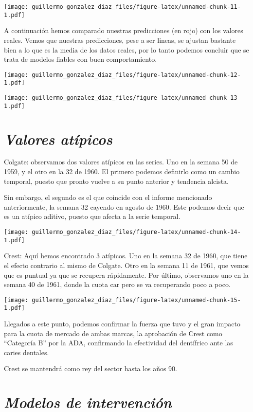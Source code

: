 \documentclass[
]{article}
\begin{document}
\texttt{[image: guillermo\_gonzalez\_diaz\_files/figure-latex/unnamed-chunk-11-1.pdf]}

A continuación hemos comparado nuestras predicciones (en rojo) con los
valores reales. Vemos que nuestras predicciones, pese a ser lineas, se
ajustan bastante bien a lo que es la media de los datos reales, por lo
tanto podemos concluir que se trata de modelos fiables con buen
comportamiento.

\texttt{[image: guillermo\_gonzalez\_diaz\_files/figure-latex/unnamed-chunk-12-1.pdf]}

\texttt{[image: guillermo\_gonzalez\_diaz\_files/figure-latex/unnamed-chunk-13-1.pdf]}

\hypertarget{valores-atuxedpicos}{%
\section{\texorpdfstring{\emph{Valores
atípicos}}{Valores atípicos}}\label{valores-atuxedpicos}}

Colgate: observamos dos valores atípicos en las series. Uno en la semana
50 de 1959, y el otro en la 32 de 1960. El primero podemos definirlo
como un cambio temporal, puesto que pronto vuelve a su punto anterior y
tendencia alcista.

Sin embargo, el segundo es el que coincide con el informe mencionado
anteriormente, la semana 32 cayendo en agosto de 1960. Este podemos
decir que es un atípico aditivo, puesto que afecta a la serie temporal.

\texttt{[image: guillermo\_gonzalez\_diaz\_files/figure-latex/unnamed-chunk-14-1.pdf]}

Crest: Aquí hemos encontrado 3 atípicos. Uno en la semana 32 de 1960,
que tiene el efecto contrario al mismo de Colgate. Otro en la semana 11
de 1961, que vemos que es puntual ya que se recupera rápidamente. Por
último, observamos uno en la semana 40 de 1961, donde la cuota car pero
se va recuperando poco a poco.

\texttt{[image: guillermo\_gonzalez\_diaz\_files/figure-latex/unnamed-chunk-15-1.pdf]}

Llegados a este punto, podemos confirmar la fuerza que tuvo y el gran
impacto para la cuota de mercado de ambas marcas, la aprobación de Crest
como ``Categoría B'' por la ADA, confirmando la efectividad del
dentífrico ante las caries dentales.

Crest se mantendrá como rey del sector hasta los años 90.

\hypertarget{modelos-de-intervenciuxf3n}{%
\section{\texorpdfstring{\emph{Modelos de
intervención}}{Modelos de intervención}}\label{modelos-de-intervenciuxf3n}}
\end{document}
